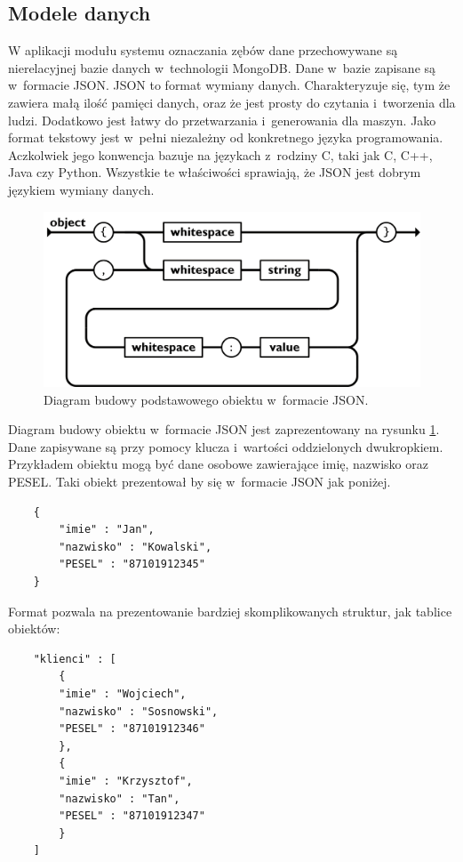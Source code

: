 \subsection{Modele danych}
W aplikacji modułu systemu oznaczania zębów dane przechowywane są nierelacyjnej bazie danych w~technologii MongoDB. Dane w~bazie zapisane są w~formacie JSON. JSON to format wymiany danych. \cite{json} Charakteryzuje się, tym że zawiera małą ilość pamięci danych, oraz że jest prosty do czytania i~tworzenia dla ludzi. Dodatkowo jest łatwy do przetwarzania i~generowania dla maszyn. Jako format tekstowy jest w~pełni niezależny od konkretnego języka programowania. Aczkolwiek jego konwencja bazuje na językach z~rodziny C, taki jak C, C++, Java czy Python. Wszystkie te właściwości sprawiają, że JSON jest dobrym językiem wymiany danych. 
\begin{figure}[ht!]
\centering\includegraphics[width=145mm,scale=1.5]{figures/json1.png}
\caption{Diagram budowy podstawowego obiektu w~formacie JSON.}
\label{fig:jsonBuild}
\end{figure}
Diagram budowy obiektu w~formacie JSON jest zaprezentowany na rysunku \ref{fig:jsonBuild}. Dane zapisywane są przy pomocy klucza i~wartości oddzielonych dwukropkiem. Przykładem obiektu mogą być dane osobowe zawierające imię, nazwisko oraz PESEL. Taki obiekt prezentował by się w~formacie JSON jak poniżej.
\begin{lstlisting}
    {
        "imie" : "Jan",
        "nazwisko" : "Kowalski",
        "PESEL" : "87101912345"
    }
\end{lstlisting}
Format pozwala na prezentowanie bardziej skomplikowanych struktur, jak tablice obiektów:
\begin{lstlisting}
    "klienci" : [
        {
        "imie" : "Wojciech",
        "nazwisko" : "Sosnowski",
        "PESEL" : "87101912346"
        },
        {
        "imie" : "Krzysztof",
        "nazwisko" : "Tan",
        "PESEL" : "87101912347"
        }
    ]
\end{lstlisting}

